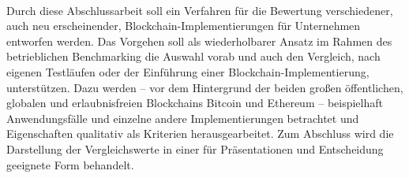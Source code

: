
\hspace{1em}\,\vspace{3em}
\setcounter{page}{1}

Durch diese Abschlussarbeit soll ein Verfahren für die Bewertung verschiedener, auch neu erscheinender, Blockchain-Implementierungen für Unternehmen entworfen werden.
Das Vorgehen soll als wiederholbarer Ansatz im Rahmen des betrieblichen Benchmarking die Auswahl vorab und auch den Vergleich, \zB{} nach eigenen Testläufen oder der Einführung einer Blockchain-Implementierung, unterstützen.
Dazu werden -- vor dem Hintergrund der beiden großen öffentlichen, globalen und erlaubnisfreien Blockchains Bitcoin und Ethereum -- beispielhaft Anwendungsfälle und einzelne andere Implementierungen betrachtet und Eigenschaften qualitativ als Kriterien herausgearbeitet. Zum Abschluss wird die Darstellung der Vergleichswerte in einer für Präsentationen und Entscheidung geeignete Form behandelt. 

